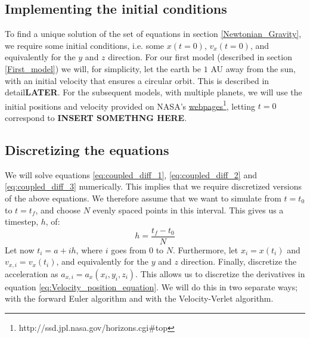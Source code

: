 \documentclass[a4paper, 10pt]{article}
\begin{document}
\subsection{Implementing the initial conditions}
To find a unique solution of the set of equations in section \ref{Newtonian_Gravity}, we require some initial conditions, i.e. some $x(t=0)$, $v_x(t=0)$, and equivalently for the $y$ and $z$ direction. For our first model (described in section \ref{First_model}) we will, for simplicity, let the earth be $1$ AU away from the sun, with an initial velocity that ensures a circular orbit. This is described in detail\textbf{LATER}. For the subsequent models, with multiple planets, we will use the initial positions and velocity provided on NASA's \href{http://ssd.jpl.nasa.gov/horizons.cgi#top}{webpages}\footnote{http://ssd.jpl.nasa.gov/horizons.cgi\#top}, letting $t=0$ correspond to \textbf{INSERT SOMETHNG HERE}.

\subsection{Discretizing the equations}
We will solve equations \ref{eq:coupled_diff_1}, \ref{eq:coupled_diff_2} and \ref{eq:coupled_diff_3} numerically. This implies that we require discretized versions of the above equations. We therefore assume that we want to simulate from $t=t_0$ to $t=t_f$, and choose $N$ evenly spaced points in this interval. This gives us a timestep, $h$, of:
$$h=\frac{t_f-t_0}{N}$$
Let now $t_i=a+ih$, where $i$ goes from $0$ to $N$. Furthermore, let $x_i=x(t_i)$ and $ v_{x,i}=v_x(t_i)$, and equivalently for the $y$ and $z$ direction. Finally, discretize the acceleration as $a_{x,i}=a_x(x_i, y_i, z_i)$. This allows us to discretize the derivatives in equation \ref{eq:Velocity_position_equation}. We will do this in two separate ways; with the forward Euler algorithm and with the Velocity-Verlet algorithm.
\end{document}
